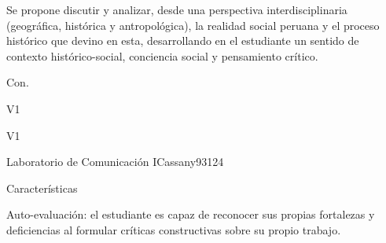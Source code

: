 \begin{syllabus}


\begin{justification}
Se propone discutir y analizar, desde una perspectiva interdisciplinaria (geográfica, histórica y antropológica), la realidad social peruana y el proceso histórico que devino en esta, desarrollando en el estudiante un sentido de contexto histórico-social, conciencia social y pensamiento crítico. 
\end{justification}

\begin{goals}
\item Con. 
\end{goals}

\begin{outcomes}{V1}
     \item {}
     \item {}
     \item {}
     \item {}
\end{outcomes}

\begin{competences}{V1}
    \item {}
    \item {}
    \item {}
\end{competences}

\begin{unit}{Laboratorio de Comunicación I}{}{Cassany93}{12}{4}
   \begin{topics}
      \item Características 
   \end{topics}
   \begin{learningoutcomes}
      \item Auto-evaluación: el estudiante es capaz de reconocer sus propias fortalezas y deficiencias al formular críticas constructivas sobre su propio trabajo.
   \end{learningoutcomes}
\end{unit}

\begin{coursebibliography}
\end{coursebibliography}

\end{syllabus}
